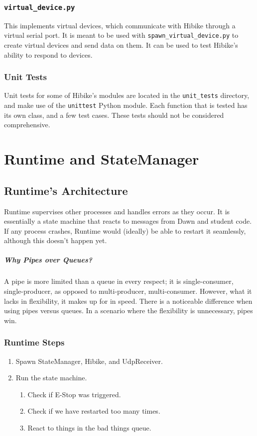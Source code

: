 \documentclass[12pt]{book}
\begin{document}
\subsection{\texttt{virtual\_device.py}}
This implements virtual devices, which communicate with Hibike
through a virtual serial port. It is meant to be used with
\texttt{spawn\_virtual\_device.py} to create virtual devices
and send data on them. It can be used to test Hibike's ability to
respond to devices.
\subsection{Unit Tests}
Unit tests for some of Hibike's modules are located in the
\texttt{unit\_tests} directory, and make use of the
\texttt{unittest} Python module. Each function that
is tested has its own class, and a few test cases. These tests
should not be considered comprehensive.


\chapter{Runtime and StateManager}
\section{Runtime's Architecture}
Runtime supervises other processes and handles errors as they occur. It is
essentially a state machine that reacts to messages from Dawn and student
code. If any process crashes, Runtime would (ideally) be able to restart
it seamlessly, although this doesn't happen yet.

\paragraph{Why Pipes over Queues?}

A pipe is more limited than a queue in every respect; it is single-consumer,
single-producer, as opposed to multi-producer, multi-consumer.
However, what it lacks in flexibility, it makes up for in speed.
There is a noticeable difference when using pipes versus queues.
In a scenario where the flexibility is unnecessary, pipes win.

\subsection{Runtime Steps}
\begin{enumerate}
    \item Spawn StateManager, Hibike, and UdpReceiver.
    \item Run the state machine.
        \begin{enumerate}
            \item Check if E-Stop was triggered.
            \item Check if we have restarted too many times.
            \item React to things in the bad things queue.
        \end{enumerate}
\end{enumerate}
\end{document}
